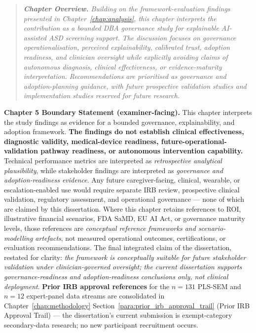 \vspace{0.3em}
\noindent\begin{quote}\itshape\small
\textbf{\color{currentaccent}Chapter Overview.}
Building on the framework-evaluation findings presented in Chapter~\ref{chap:analysis}, this chapter interprets the contribution as a bounded DBA governance study for explainable AI-assisted ASD screening support. The discussion focuses on governance operationalisation, perceived explainability, calibrated trust, adoption readiness, and clinician oversight while explicitly avoiding claims of autonomous diagnosis, clinical effectiveness, or evidence-maturity interpretation. Recommendations are prioritised as governance and adoption-planning guidance, with future prospective validation studies and implementation studies reserved for future research.
\end{quote}
\vspace{0.3em}

\noindent\textbf{Chapter 5 Boundary Statement (examiner-facing).}
\label{para:ch5_boundary_statement}
This chapter interprets the study findings as evidence for a bounded governance, explainability, and adoption framework. \textbf{The findings do not establish clinical effectiveness, diagnostic validity, medical-device readiness, future-operational-validation pathway readiness, or autonomous intervention capability.} Technical performance metrics are interpreted as \emph{retrospective analytical plausibility}, while stakeholder findings are interpreted as \emph{governance and adoption-readiness evidence}. Any future caregiver-facing, clinical, wearable, or escalation-enabled use would require separate IRB review, prospective clinical validation, regulatory assessment, and operational governance --- none of which are claimed by this dissertation. Where this chapter retains references to ROI, illustrative financial scenarios, FDA SaMD, EU AI Act, or governance maturity levels, those references are \emph{conceptual reference frameworks and scenario-modelling artefacts}, not measured operational outcomes, certifications, or evaluation recommendations. The final integrated claim of the dissertation, restated for clarity: \emph{the framework is conceptually suitable for future stakeholder validation under clinician-governed oversight; the current dissertation supports governance-readiness and adoption-readiness conclusions only, not clinical deployment}. \textbf{Prior IRB approval references} for the $n{=}131$ PLS-SEM and $n{=}12$ expert-panel data streams are consolidated in Chapter~\ref{chap:methodology} Section~\ref{para:prior_irb_approval_trail} (Prior IRB Approval Trail) --- the dissertation's current submission is exempt-category secondary-data research; no new participant recruitment occurs.
\vspace{0.3em}

